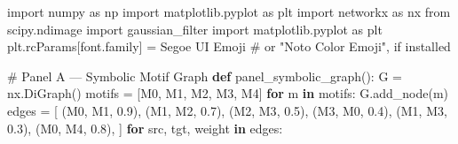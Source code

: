 \documentclass[
  11pt,
]{article}
\newenvironment{Shaded}{\begin{snugshade}}{\end{snugshade}}
\newcommand{\CommentTok}[1]{\textcolor[rgb]{0.37,0.37,0.37}{#1}}
\newcommand{\ControlFlowTok}[1]{\textcolor[rgb]{0.00,0.23,0.31}{\textbf{#1}}}
\newcommand{\FloatTok}[1]{\textcolor[rgb]{0.68,0.00,0.00}{#1}}
\newcommand{\ImportTok}[1]{\textcolor[rgb]{0.00,0.46,0.62}{#1}}
\newcommand{\KeywordTok}[1]{\textcolor[rgb]{0.00,0.23,0.31}{\textbf{#1}}}
\newcommand{\NormalTok}[1]{\textcolor[rgb]{0.00,0.23,0.31}{#1}}
\newcommand{\OperatorTok}[1]{\textcolor[rgb]{0.37,0.37,0.37}{#1}}
\newcommand{\StringTok}[1]{\textcolor[rgb]{0.13,0.47,0.30}{#1}}
\begin{document}
\begin{Shaded}
\begin{Highlighting}[]
\ImportTok{import}\NormalTok{ numpy }\ImportTok{as}\NormalTok{ np}
\ImportTok{import}\NormalTok{ matplotlib.pyplot }\ImportTok{as}\NormalTok{ plt}
\ImportTok{import}\NormalTok{ networkx }\ImportTok{as}\NormalTok{ nx}
\ImportTok{from}\NormalTok{ scipy.ndimage }\ImportTok{import}\NormalTok{ gaussian\_filter}
\ImportTok{import}\NormalTok{ matplotlib.pyplot }\ImportTok{as}\NormalTok{ plt}
\NormalTok{plt.rcParams[}\StringTok{\textquotesingle{}font.family\textquotesingle{}}\NormalTok{] }\OperatorTok{=} \StringTok{\textquotesingle{}Segoe UI Emoji\textquotesingle{}}  \CommentTok{\# or "Noto Color Emoji", if installed}

\CommentTok{\# Panel A — Symbolic Motif Graph}
\KeywordTok{def}\NormalTok{ panel\_symbolic\_graph():}
\NormalTok{    G }\OperatorTok{=}\NormalTok{ nx.DiGraph()}
\NormalTok{    motifs }\OperatorTok{=}\NormalTok{ [}\StringTok{\textquotesingle{}M0\textquotesingle{}}\NormalTok{, }\StringTok{\textquotesingle{}M1\textquotesingle{}}\NormalTok{, }\StringTok{\textquotesingle{}M2\textquotesingle{}}\NormalTok{, }\StringTok{\textquotesingle{}M3\textquotesingle{}}\NormalTok{, }\StringTok{\textquotesingle{}M4\textquotesingle{}}\NormalTok{]}
    \ControlFlowTok{for}\NormalTok{ m }\KeywordTok{in}\NormalTok{ motifs:}
\NormalTok{        G.add\_node(m)}
\NormalTok{    edges }\OperatorTok{=}\NormalTok{ [}
\NormalTok{        (}\StringTok{\textquotesingle{}M0\textquotesingle{}}\NormalTok{, }\StringTok{\textquotesingle{}M1\textquotesingle{}}\NormalTok{, }\FloatTok{0.9}\NormalTok{),}
\NormalTok{        (}\StringTok{\textquotesingle{}M1\textquotesingle{}}\NormalTok{, }\StringTok{\textquotesingle{}M2\textquotesingle{}}\NormalTok{, }\FloatTok{0.7}\NormalTok{),}
\NormalTok{        (}\StringTok{\textquotesingle{}M2\textquotesingle{}}\NormalTok{, }\StringTok{\textquotesingle{}M3\textquotesingle{}}\NormalTok{, }\FloatTok{0.5}\NormalTok{),}
\NormalTok{        (}\StringTok{\textquotesingle{}M3\textquotesingle{}}\NormalTok{, }\StringTok{\textquotesingle{}M0\textquotesingle{}}\NormalTok{, }\FloatTok{0.4}\NormalTok{),}
\NormalTok{        (}\StringTok{\textquotesingle{}M1\textquotesingle{}}\NormalTok{, }\StringTok{\textquotesingle{}M3\textquotesingle{}}\NormalTok{, }\FloatTok{0.3}\NormalTok{),}
\NormalTok{        (}\StringTok{\textquotesingle{}M0\textquotesingle{}}\NormalTok{, }\StringTok{\textquotesingle{}M4\textquotesingle{}}\NormalTok{, }\FloatTok{0.8}\NormalTok{),}
\NormalTok{    ]}
    \ControlFlowTok{for}\NormalTok{ src, tgt, weight }\KeywordTok{in}\NormalTok{ edges:}

\end{Highlighting}
\end{Shaded}
\end{document}
